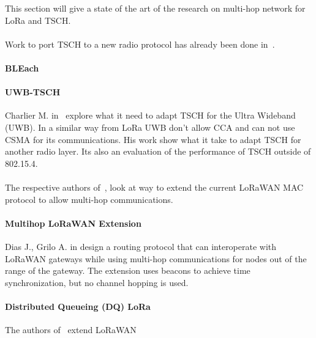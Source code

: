 This section will give a state of the art of the research on
multi-hop network for LoRa and TSCH.

\paragraph{}

Work to port TSCH to a new radio protocol has already been done
in~\cite{uwbtsch}.

\paragraph{BLEach}

\paragraph{UWB-TSCH}

Charlier M. in~\cite{uwbtsch} explore what it need to adapt TSCH for the Ultra
Wideband (UWB). 
In a similar way from LoRa UWB don't allow CCA and can not use CSMA for its 
communications.
His work show what it take to adapt TSCH for another radio layer. 
Its also an evaluation of the performance of TSCH outside of 802.15.4.

\paragraph{}

The respective authors of~\cite{DIAS2018424, 8856256}, look at way to extend
the current LoRaWAN MAC protocol to allow multi-hop communications.

\paragraph{Multihop LoRaWAN Extension} Dias J., Grilo A. in \cite{DIAS2018424}
design a routing protocol that can interoperate with LoRaWAN gateways while
using multi-hop communications for nodes out of the range of the gateway.  
The extension uses beacons to achieve time synchronization, but no channel
hopping is used.

\paragraph{Distributed Queueing (DQ) LoRa}

The authors of~\cite{8856256} extend LoRaWAN


